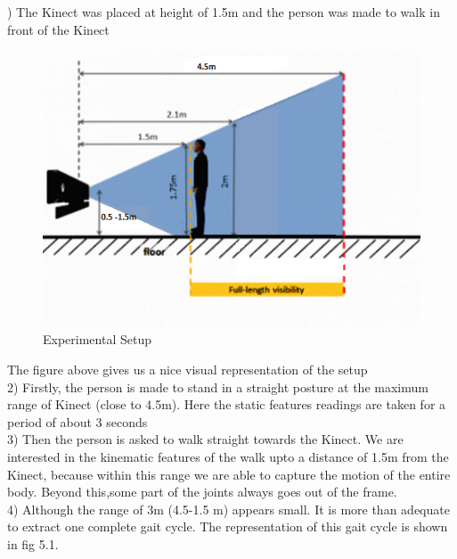 ) The Kinect was placed at height of 1.5m and the person was made to walk in front of the Kinect\\ 
\begin{figure}[h]
\centering
\includegraphics[scale=0.75]{exp.png}
\caption{Experimental Setup}

\end{figure}

\noindent The figure above gives us a nice visual representation of the setup\\
2) Firstly, the person is made to stand in a straight posture at the maximum range of Kinect (close to 4.5m). Here the static features readings are taken for a period of about 3 seconds\\
3) Then the person is asked to walk straight towards the Kinect. We are interested in the kinematic features of the walk upto a distance of 1.5m from the Kinect, because within this range we are able to capture the motion of the entire body. Beyond this,some part of the joints always goes out of the frame.\\
4) Although the range of 3m (4.5-1.5 m) appears small. It is more than adequate to extract one complete gait cycle. The representation of this gait cycle is shown in fig 5.1.\\




























